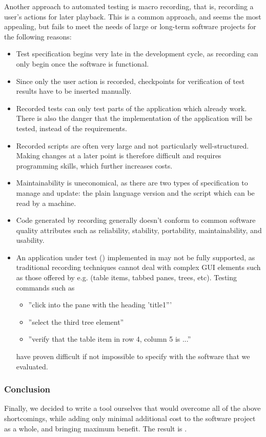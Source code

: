 Another approach to automated testing is macro recording, that is, 
recording a user's actions for later playback.
This is a common approach, and seems the most appealing,
 but fails to meet the needs of large or long-term software projects 
for the following reasons:
\begin{itemize}
\item Test specification begins very late in the development cycle,
 as recording can only begin once the software is functional. 
\item Since only the user action is recorded, checkpoints for verification
of test results have to be inserted manually.
\item Recorded tests can only test parts of the application which already work. There is also the danger that the implementation of the application will be tested, instead of the requirements. 
\item Recorded scripts are often very large and not particularly 
well-structured. Making changes at a later point is therefore 
difficult and requires programming skills, which further increases costs. 
\item Maintainability is uneconomical, as there are two types of specification
to manage and update: the plain language version and the script which can be 
read by a machine. 
\item Code generated by recording generally doesn't conform to
 common software quality attributes such as reliability, stability, 
portability, maintainability, and usability.
\item An application under test (\gdaut) implemented in  may not be fully supported, as
traditional recording techniques cannot deal with complex
 GUI elements such as those offered 
by e.g.  (table items, tabbed panes, trees, etc). Testing commands such as
  \begin{itemize}
    \item{''click into the pane with the heading 'title1'''}
    \item{''select the third tree element''}
    \item{''verify that the table item in row 4, column 5 is ...''}
  \end{itemize}
have proven difficult if not impossible to specify with the software that we evaluated.
\end{itemize}

\subsubsection{Conclusion}

Finally, we decided to write a tool ourselves that would overcome all
of the above shortcomings, while adding only minimal additional cost to 
the software project as a whole, and bringing maximum benefit. The result is \GD{}.  
